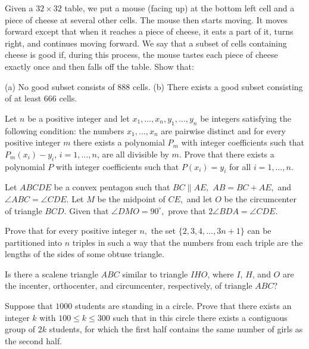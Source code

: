 \documentclass[11pt]{scrartcl}
\begin{document}
\begin{problem}[1989615889874190156]
	Given a $32 \times 32$ table, we put a mouse (facing up) at the bottom left cell and a piece of cheese at several other cells. The mouse then starts moving. It moves forward except that when it reaches a piece of cheese, it eats a part of it, turns right, and continues moving forward. We say that a subset of cells containing cheese is good if, during this process, the mouse tastes each piece of cheese exactly once and then falls off the table. Show that:

(a) No good subset consists of 888 cells.
(b) There exists a good subset consisting of at least 666 cells.
\end{problem}
\begin{problem}[320133496959351613]
Let $n$ be a positive integer and let $x_1,\ldots,x_n,y_1,\ldots,y_n$ be integers satisfying the following
condition: the numbers $x_1,\ldots,x_n$ are pairwise distinct and for every positive integer $m$ there
exists a polynomial $P_m$ with integer coefficients such that $P_m(x_i) - y_i$, $i=1,\ldots,n$, are all divisible by $m$. Prove that there exists a polynomial $P$ with integer coefficients such that $P(x_i) = y_i$ for all $i=1,\ldots,n$.
\end{problem}
\begin{problem}[5891289107244537458]
Let $ABCDE$ be a convex pentagon such that $BC \parallel AE,$ $AB = BC +  AE,$ and $\angle ABC = \angle CDE.$ Let $M$ be the midpoint of $CE,$ and let $O$ be the circumcenter of triangle $BCD.$ Given that $\angle DMO = 90^{\circ},$ prove that $2 \angle BDA = \angle CDE.$
\end{problem}
\begin{problem}[563612490071424]
	Prove that for every positive integer $n,$ the set $\{2,3,4,\ldots,3n+1\}$ can be partitioned into $n$ triples in such a way that the numbers from each triple are the lengths of the sides of some obtuse triangle.
\end{problem}
\begin{problem}[2672133756769464425]
Is there a scalene triangle $ABC$ similar to triangle $IHO$, where $I$, $H$, and $O$ are the incenter, orthocenter, and circumcenter, respectively, of triangle $ABC$?
\end{problem}
\begin{problem}[575901379082524]
Suppose that $1000$ students are standing in a circle. Prove that there exists an integer $k$ with $100 \leq k \leq 300$ such that in this circle there exists a contiguous group of $2k$ students, for which the first half contains the same number of girls as the second half.
\end{problem}
\end{document}
